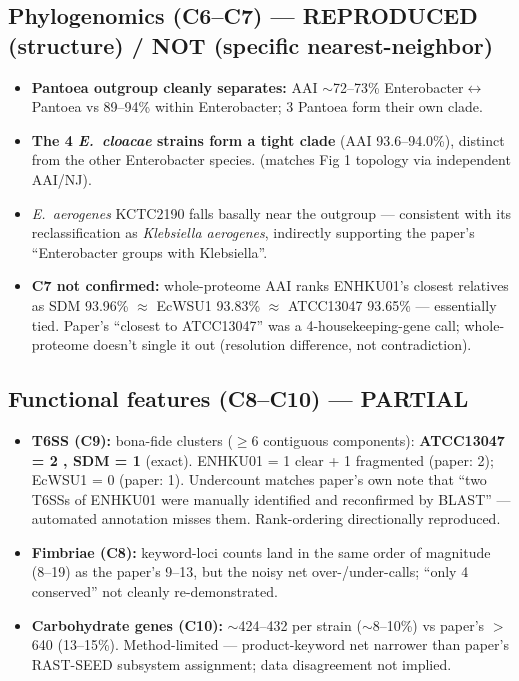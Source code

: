 \documentclass[11pt,letterpaper]{article}
\begin{document}
\subsection{Phylogenomics (C6--C7) --- REPRODUCED (structure) / NOT (specific nearest-neighbor)}
\begin{itemize}[leftmargin=*]
    \item \textbf{Pantoea outgroup cleanly separates:} AAI $\sim$72--73\% Enterobacter$\leftrightarrow$Pantoea vs 89--94\% within Enterobacter; 3 Pantoea form their own clade. \checkmark
    \item \textbf{The 4 \textit{E.\ cloacae} strains form a tight clade} (AAI 93.6--94.0\%), distinct from the other Enterobacter species. \checkmark (matches Fig 1 topology via independent AAI/NJ).
    \item \textit{E.\ aerogenes} KCTC2190 falls basally near the outgroup --- consistent with its reclassification as \textit{Klebsiella aerogenes}, indirectly supporting the paper's ``Enterobacter groups with Klebsiella''.
    \item \textbf{C7 not confirmed:} whole-proteome AAI ranks ENHKU01's closest relatives as SDM 93.96\% $\approx$ EcWSU1 93.83\% $\approx$ ATCC13047 93.65\% --- essentially tied. Paper's ``closest to ATCC13047'' was a 4-housekeeping-gene call; whole-proteome doesn't single it out (resolution difference, not contradiction).
\end{itemize}

\subsection{Functional features (C8--C10) --- PARTIAL}
\begin{itemize}[leftmargin=*]
    \item \textbf{T6SS (C9):} bona-fide clusters ($\geq$6 contiguous components): \textbf{ATCC13047 = 2 \checkmark, SDM = 1 \checkmark} (exact). ENHKU01 = 1 clear + 1 fragmented (paper: 2); EcWSU1 = 0 (paper: 1). Undercount matches paper's own note that ``two T6SSs of ENHKU01 were manually identified and reconfirmed by BLAST'' --- automated annotation misses them. Rank-ordering directionally reproduced.
    \item \textbf{Fimbriae (C8):} keyword-loci counts land in the same order of magnitude (8--19) as the paper's 9--13, but the noisy net over-/under-calls; ``only 4 conserved'' not cleanly re-demonstrated.
    \item \textbf{Carbohydrate genes (C10):} $\sim$424--432 per strain ($\sim$8--10\%) vs paper's $>$640 (13--15\%). Method-limited --- product-keyword net narrower than paper's RAST-SEED subsystem assignment; data disagreement not implied.
\end{itemize}
\end{document}
